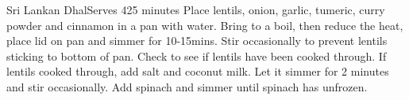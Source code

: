 \begin{recipe}{Sri Lankan Dhal}{Serves 4}{25 minutes}
Place lentils, onion, garlic, tumeric, curry powder and cinnamon in a pan with water. Bring to a boil,
then reduce the heat, place lid on pan and simmer for 10-15mins.  Stir occasionally to prevent lentils 
sticking to bottom of pan.  Check to see if lentils have been cooked through.  
If lentils cooked through, add salt and coconut milk.  Let it simmer for 2 minutes and stir occasionally.  
Add spinach and simmer until spinach has unfrozen.
\end{recipe}